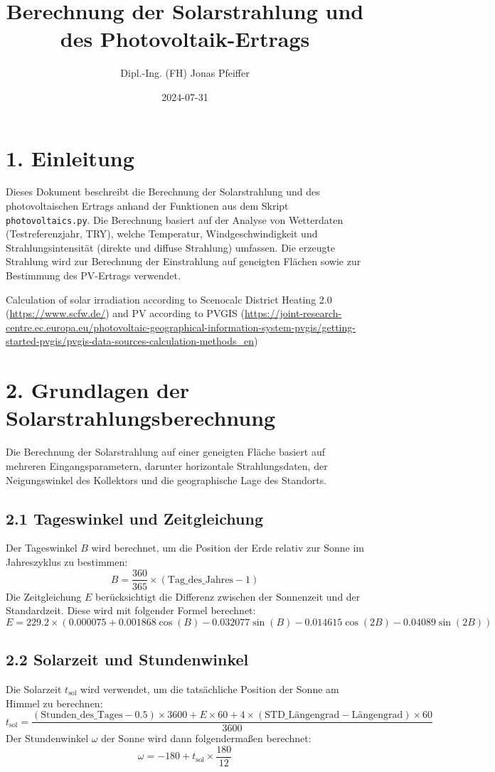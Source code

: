 \documentclass{article}
\title{Berechnung der Solarstrahlung und des Photovoltaik-Ertrags}
\author{Dipl.-Ing. (FH) Jonas Pfeiffer}
\date{2024-07-31}
\begin{document}
\maketitle

\section*{1. Einleitung}
Dieses Dokument beschreibt die Berechnung der Solarstrahlung und des photovoltaischen Ertrags anhand der Funktionen aus dem Skript \texttt{photovoltaics.py}. Die Berechnung basiert auf der Analyse von Wetterdaten (Testreferenzjahr, TRY), welche Temperatur, Windgeschwindigkeit und Strahlungsintensität (direkte und diffuse Strahlung) umfassen. Die erzeugte Strahlung wird zur Berechnung der Einstrahlung auf geneigten Flächen sowie zur Bestimmung des PV-Ertrags verwendet.

Calculation of solar irradiation according to Scenocalc District Heating 2.0 (\url{https://www.scfw.de/}) and PV according to PVGIS (\url{https://joint-research-centre.ec.europa.eu/photovoltaic-geographical-information-system-pvgis/getting-started-pvgis/pvgis-data-sources-calculation-methods_en})

\section*{2. Grundlagen der Solarstrahlungsberechnung}
Die Berechnung der Solarstrahlung auf einer geneigten Fläche basiert auf mehreren Eingangsparametern, darunter horizontale Strahlungsdaten, der Neigungswinkel des Kollektors und die geographische Lage des Standorts.

\subsection*{2.1 Tageswinkel und Zeitgleichung}
Der Tageswinkel \( B \) wird berechnet, um die Position der Erde relativ zur Sonne im Jahreszyklus zu bestimmen:
\[
B = \frac{360}{365} \times (\text{Tag\_des\_Jahres} - 1)
\]
Die Zeitgleichung \( E \) berücksichtigt die Differenz zwischen der Sonnenzeit und der Standardzeit. Diese wird mit folgender Formel berechnet:
\[
E = 229.2 \times \left( 0.000075 + 0.001868 \cos(B) - 0.032077 \sin(B) - 0.014615 \cos(2B) - 0.04089 \sin(2B) \right)
\]

\subsection*{2.2 Solarzeit und Stundenwinkel}
Die Solarzeit \( t_{\text{sol}} \) wird verwendet, um die tatsächliche Position der Sonne am Himmel zu berechnen:
\[
t_{\text{sol}} = \frac{(\text{Stunden\_des\_Tages} - 0.5) \times 3600 + E \times 60 + 4 \times (\text{STD\_Längengrad} - \text{Längengrad}) \times 60}{3600}
\]
Der Stundenwinkel \( \omega \) der Sonne wird dann folgendermaßen berechnet:
\[
\omega = -180 + t_{\text{sol}} \times \frac{180}{12}
\]
\end{document}
